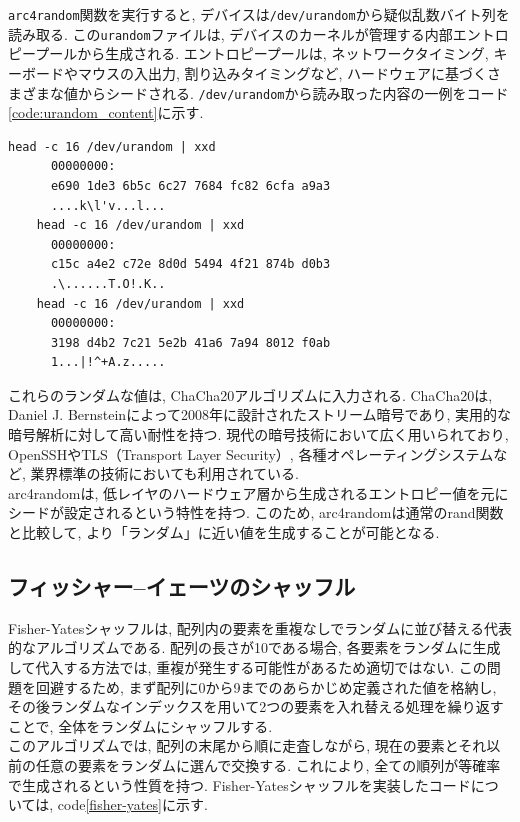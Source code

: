 \documentclass[a4j, 12pt ]{jarticle}
\begin{document}
\texttt{arc4random}関数を実行すると, デバイスは\texttt{/dev/urandom}から疑似乱数バイト列を読み取る. この\texttt{urandom}ファイルは, デバイスのカーネルが管理する内部エントロピープールから生成される. エントロピープールは, ネットワークタイミング, キーボードやマウスの入出力, 割り込みタイミングなど, ハードウェアに基づくさまざまな値からシードされる. \texttt{/dev/urandom}から読み取った内容の一例をコード\ref{code:urandom_content}に示す.\\

\begin{lstlisting}[caption={urandomの内容のを読み取り結果例}, label={code:urandom_content}]
    head -c 16 /dev/urandom | xxd
      00000000: 
      e690 1de3 6b5c 6c27 7684 fc82 6cfa a9a3 
      ....k\l'v...l...
    head -c 16 /dev/urandom | xxd
      00000000: 
      c15c a4e2 c72e 8d0d 5494 4f21 874b d0b3 
      .\......T.O!.K..
    head -c 16 /dev/urandom | xxd
      00000000:
      3198 d4b2 7c21 5e2b 41a6 7a94 8012 f0ab 
      1...|!^+A.z.....
\end{lstlisting}

これらのランダムな値は, ChaCha20アルゴリズムに入力される. ChaCha20は, Daniel J. Bernsteinによって2008年に設計されたストリーム暗号であり, 実用的な暗号解析に対して高い耐性を持つ. 現代の暗号技術において広く用いられており, OpenSSHやTLS（Transport Layer Security）, 各種オペレーティングシステムなど, 業界標準の技術においても利用されている.\cite{arc4randomManual}\\

arc4randomは, 低レイヤのハードウェア層から生成されるエントロピー値を元にシードが設定されるという特性を持つ. このため, arc4randomは通常のrand関数と比較して, より「ランダム」に近い値を生成することが可能となる.
\subsection{フィッシャー–イェーツのシャッフル}
Fisher-Yatesシャッフルは, 配列内の要素を重複なしでランダムに並び替える代表的なアルゴリズムである. 配列の長さが10である場合, 各要素をランダムに生成して代入する方法では, 重複が発生する可能性があるため適切ではない. この問題を回避するため, まず配列に0から9までのあらかじめ定義された値を格納し, その後ランダムなインデックスを用いて2つの要素を入れ替える処理を繰り返すことで, 全体をランダムにシャッフルする.\\

このアルゴリズムでは, 配列の末尾から順に走査しながら, 現在の要素とそれ以前の任意の要素をランダムに選んで交換する. これにより, 全ての順列が等確率で生成されるという性質を持つ. Fisher-Yatesシャッフルを実装したコードについては, code\ref{fisher-yates}に示す.\cite{knuth1998art}\\
\end{document}
